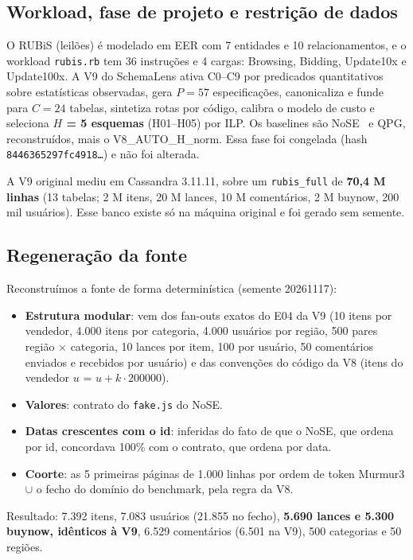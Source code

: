 \documentclass[10pt,a4paper,twoside]{article}
\theoremstyle{definition}\newtheorem{definicao}{Definição}
\begin{document}
\subsection{Workload, fase de projeto e restrição de dados}
O RUBiS (leilões) é modelado em EER com 7 entidades e 10 relacionamentos, e o workload \texttt{rubis.rb} tem 36 instruções e 4 cargas: Browsing, Bidding, Update10x e Update100x. A V9 do SchemaLens ativa C0--C9 por predicados quantitativos sobre estatísticas observadas, gera $P=57$ especificações, canonicaliza e funde para $C=24$ tabelas, sintetiza rotas por código, calibra o modelo de custo e seleciona \textbf{$H$ = 5 esquemas} (H01--H05) por ILP. Os baselines são NoSE~\cite{nose} e QPG, reconstruídos, mais o V8\_AUTO\_H\_norm. Essa fase foi congelada (hash \texttt{8446365297fc4918\ldots}) e não foi alterada.

A V9 original mediu em Cassandra 3.11.11, sobre um \texttt{rubis\_full} de \textbf{70,4 M linhas} (13 tabelas; 2 M itens, 20 M lances, 10 M comentários, 2 M buynow, 200 mil usuários). Esse banco existe só na máquina original e foi gerado sem semente.

\subsection{Regeneração da fonte}
Reconstruímos a fonte de forma determinística (semente 20261117):
\begin{itemize}
\item \textbf{Estrutura modular}: vem dos fan-outs exatos do E04 da V9 (10 itens por vendedor, 4.000 itens por categoria, 4.000 usuários por região, 500 pares região $\times$ categoria, 10 lances por item, 100 por usuário, 50 comentários enviados e recebidos por usuário) e das convenções do código da V8 (itens do vendedor $u$ = $u+k\cdot 200000$).
\item \textbf{Valores}: contrato do \texttt{fake.js} do NoSE.
\item \textbf{Datas crescentes com o id}: inferidas do fato de que o NoSE, que ordena por id, concordava 100\% com o contrato, que ordena por data.
\item \textbf{Coorte}: as 5 primeiras páginas de 1.000 linhas por ordem de token Murmur3 $\cup$ o fecho do domínio do benchmark, pela regra da V8.
\end{itemize}
Resultado: 7.392 itens, 7.083 usuários (21.855 no fecho), \textbf{5.690 lances e 5.300 buynow, idênticos à V9}, 6.529 comentários (6.501 na V9), 500 categorias e 50 regiões.
\end{document}
